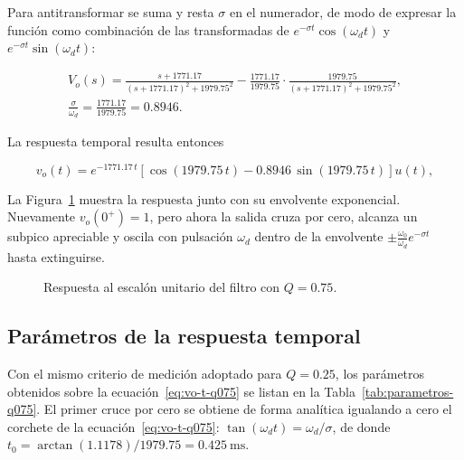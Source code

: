 Para antitransformar se suma y resta $\sigma$ en el numerador, de modo de expresar la función como
combinación de las transformadas de $e^{-\sigma t}\cos(\omega_d t)$ y $e^{-\sigma t}\sin(\omega_d t)$:

\begin{gather*}
  V_o(s) = \frac{s + \num{1771.17}}{\left(s + \num{1771.17}\right)^2 + \num{1979.75}^2}
         - \frac{\num{1771.17}}{\num{1979.75}} \cdot
           \frac{\num{1979.75}}{\left(s + \num{1771.17}\right)^2 + \num{1979.75}^2}, \\[4pt]
  \frac{\sigma}{\omega_d} = \frac{\num{1771.17}}{\num{1979.75}} = \num{0.8946}.
\end{gather*}

La respuesta temporal resulta entonces

\begin{equation}
  v_o(t) = e^{-\num{1771.17}\, t}
           \left[\cos\left(\num{1979.75}\, t\right) - \num{0.8946}\, \sin\left(\num{1979.75}\, t\right)\right] u(t),
  \label{eq:vo-t-q075}
\end{equation}


La Figura~\ref{fig:escalon-q075} muestra la respuesta junto con
su envolvente exponencial. Nuevamente $v_o(0^+) = 1$, pero ahora la salida cruza por cero, alcanza un
subpico apreciable y oscila con pulsación $\omega_d$ dentro de la envolvente
$\pm\frac{\omega_0}{\omega_d} e^{-\sigma t}$ hasta extinguirse.

\begin{figure}[!ht]
  \centering
  
  \caption{Respuesta al escalón unitario del filtro con $Q = \num{0.75}$.}
  \label{fig:escalon-q075}
\end{figure}

\subsection{Parámetros de la respuesta temporal}

Con el mismo criterio de medición adoptado para $Q = \num{0.25}$, los parámetros obtenidos sobre la
ecuación~\eqref{eq:vo-t-q075} se listan en la Tabla~\ref{tab:parametros-q075}. El primer cruce por cero se
obtiene de forma analítica igualando a cero el corchete de la ecuación~\eqref{eq:vo-t-q075}:
$\tan(\omega_d t) = \omega_d/\sigma$, de donde
$t_0 = \arctan(\num{1.1178})/\num{1979.75} = \qty{0.425}{\milli\second}$.

